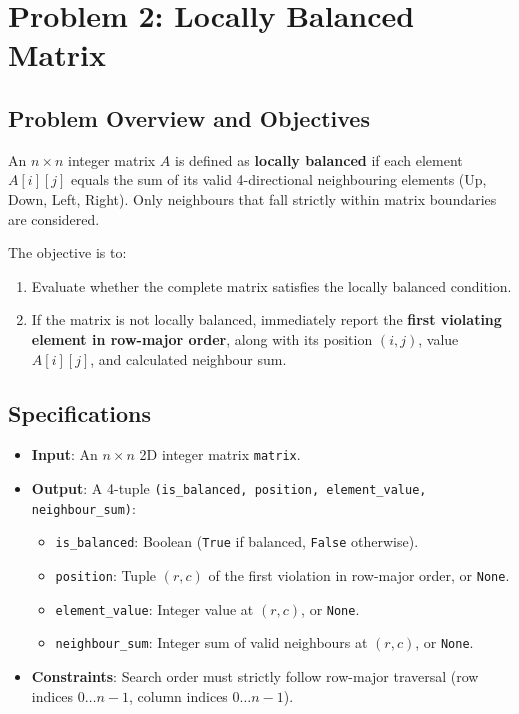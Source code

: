 \section{Problem 2: Locally Balanced Matrix}

\subsection{Problem Overview and Objectives}
An $n \times n$ integer matrix $A$ is defined as \textbf{locally balanced} if each element $A[i][j]$ equals the sum of its valid 4-directional neighbouring elements (Up, Down, Left, Right). Only neighbours that fall strictly within matrix boundaries are considered.

The objective is to:
\begin{enumerate}
    \item Evaluate whether the complete matrix satisfies the locally balanced condition.
    \item If the matrix is not locally balanced, immediately report the \textbf{first violating element in row-major order}, along with its position $(i, j)$, value $A[i][j]$, and calculated neighbour sum.
\end{enumerate}

\subsection{Specifications}
\begin{itemize}
    \item \textbf{Input}: An $n \times n$ 2D integer matrix \texttt{matrix}.
    \item \textbf{Output}: A 4-tuple \texttt{(is\_balanced, position, element\_value, neighbour\_sum)}:
    \begin{itemize}
        \item \texttt{is\_balanced}: Boolean (\texttt{True} if balanced, \texttt{False} otherwise).
        \item \texttt{position}: Tuple $(r, c)$ of the first violation in row-major order, or \texttt{None}.
        \item \texttt{element\_value}: Integer value at $(r, c)$, or \texttt{None}.
        \item \texttt{neighbour\_sum}: Integer sum of valid neighbours at $(r, c)$, or \texttt{None}.
    \end{itemize}
    \item \textbf{Constraints}: Search order must strictly follow row-major traversal (row indices $0 \dots n-1$, column indices $0 \dots n-1$).
\end{itemize}

